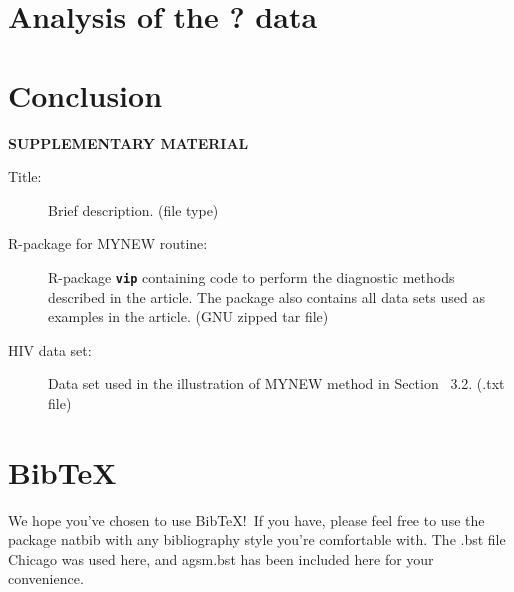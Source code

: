\documentclass[12pt]{article}
\def\pkg#1{\textbf{\texttt{#1}}}
\begin{document}
\section{Analysis of the ? data}



\section{Conclusion}
\label{sec:conc}




\bigskip
\begin{center}
{\large\bf SUPPLEMENTARY MATERIAL}
\end{center}

\begin{description}

\item[Title:] Brief description. (file type)

\item[R-package for  MYNEW routine:] R-package \pkg{vip} containing code to perform the diagnostic methods described in the article. The package also contains all data sets used as examples in the article. (GNU zipped tar file)

\item[HIV data set:] Data set used in the illustration of MYNEW method in Section~ 3.2. (.txt file)

\end{description}


\section{BibTeX}

We hope you've chosen to use BibTeX!\ If you have, please feel free to use the package natbib with any bibliography style you're comfortable with. The .bst file Chicago was used here, and agsm.bst has been included here for your convenience.




\end{document}
